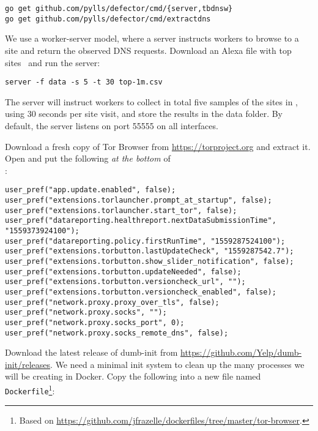 \documentclass{article}
\begin{document}
\begin{lstlisting}
go get github.com/pylls/defector/cmd/{server,tbdnsw}
go get github.com/pylls/defector/cmd/extractdns
\end{lstlisting}

We use a worker-server model, where a server instructs workers to browse to a
site and return the observed DNS requests. Download an Alexa file with top
sites~\cite{alexatop1k} and run the server:

\begin{lstlisting}
server -f data -s 5 -t 30 top-1m.csv
\end{lstlisting}
The server will instruct workers to collect in total
five samples of the sites in , using 30 seconds per site visit,
and store the results in the data folder. By default, the server listens on
port 55555 on all interfaces.

Download a fresh copy of Tor Browser from \url{https://torproject.org} and extract it.
Open 
and put the
following \emph{at the bottom} of\\ :

\begin{lstlisting}
user_pref("app.update.enabled", false);
user_pref("extensions.torlauncher.prompt_at_startup", false);
user_pref("extensions.torlauncher.start_tor", false);
user_pref("datareporting.healthreport.nextDataSubmissionTime", "1559373924100");
user_pref("datareporting.policy.firstRunTime", "1559287524100");
user_pref("extensions.torbutton.lastUpdateCheck", "1559287542.7");
user_pref("extensions.torbutton.show_slider_notification", false);
user_pref("extensions.torbutton.updateNeeded", false);
user_pref("extensions.torbutton.versioncheck_url", "");
user_pref("extensions.torbutton.versioncheck_enabled", false);
user_pref("network.proxy.proxy_over_tls", false);
user_pref("network.proxy.socks", "");
user_pref("network.proxy.socks_port", 0);
user_pref("network.proxy.socks_remote_dns", false);
\end{lstlisting}

Download the latest release of dumb-init from
\url{https://github.com/Yelp/dumb-init/releases}. We need a minimal init system
to clean up the many processes we will be creating in Docker.
Copy the following into a
new file named \texttt{Dockerfile}\footnote{Based on
\url{https://github.com/jfrazelle/dockerfiles/tree/master/tor-browser}.}:
\end{document}
